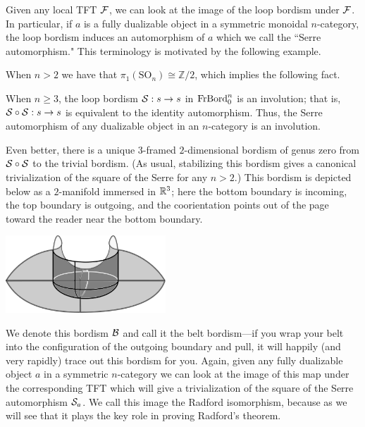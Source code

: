 \documentclass{amsart}
\begin{document}
Given any local TFT $\mathcal F$, we can look at the image of the loop bordism under $\mathcal F$.  In particular, if $a$ is a fully dualizable object in a symmetric monoidal $n$-category, the loop bordism induces an automorphism of $a$ which we call the ``Serre automorphism."  This terminology is motivated by the following example.

\begin{example}
\end{example}

When $n>2$ we have that $\pi_1(\mathrm{SO}_n) \cong \mathbb{Z}/2$, which implies the following fact.

\begin{proposition}
When $n \geq 3$, the loop bordism $\mathcal S: s \rightarrow s$ in $\mathrm{FrBord}_0^n$ is an involution; that is, $\mathcal S \circ \mathcal S : s \rightarrow s$ is equivalent to the identity automorphism.   Thus, the Serre automorphism of any dualizable object in an $n$-category is an involution.
\end{proposition}

Even better, there is a unique $3$-framed $2$-dimensional bordism of genus zero from $\mathcal S \circ \mathcal S$ to the trivial bordism.  (As usual, stabilizing this bordism gives a canonical trivialization of the square of the Serre for any $n > 2$.)  This bordism is depicted below as a $2$-manifold immersed in $\mathbb R^3$; here the bottom boundary is incoming, the top boundary is outgoing, and the coorientation points out of the page toward the reader near the bottom boundary.

\begin{center}
\includegraphics[width=60mm]{cobordism.png}
\end{center}

We denote this bordism $\mathcal B$ and call it the belt bordism---if you wrap your belt into the configuration of the outgoing boundary and pull, it will happily (and very rapidly) trace out this bordism for you.  Again, given any fully dualizable object $a$ in a symmetric $n$-category we can look at the image of this map under the corresponding TFT which will give a trivialization of the square of the Serre automorphism $\mathcal S_a$.  We call this image the Radford isomorphism, because as we will see that it plays the key role in proving Radford's theorem.
\end{document}
